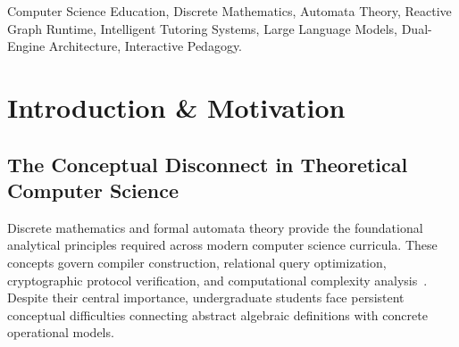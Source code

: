 \documentclass[conference]{IEEEtran}
\begin{document}
\begin{abstract}
Undergraduate computing curricula require students to master abstract discrete mathematics alongside formal language automata. In practice, students struggle because existing instructional tools are fragmented across isolated desktop utilities, while commercial Large Language Models (LLMs) hallucinate arithmetic bounds, invert state transitions, and produce broken \LaTeX{} code. This paper presents \textbf{LogicVerse}, an open-source browser-native visual computing IDE and dual-engine intelligent tutoring system uniting discrete mathematics and formal language automata. LogicVerse incorporates a client-side topological Directed Acyclic Graph (DAG) compilation engine delivering sub-millisecond evaluation ($< 3.5$\,ms for 100-node hypergraphs) alongside \textbf{LogicAI}: a hybrid tutoring architecture uniting a deterministic combinatorial solver (Tier 1) for guaranteed arithmetic precision with an LLM-driven grounded tutor (Tier 2) receiving continuous canvas topology vectors. In a quantitative benchmark of 100 discrete counting problems, LogicVerse achieved 100.0\% precision and 0.0\% hallucination vs. 86.0\% for GPT-4o and 82.5\% for Gemini 1.5. A controlled between-subjects pedagogical user study across $N = 48$ undergraduate students demonstrated higher normalized learning gains ($g = 0.68 \pm 0.12$ vs. $0.34 \pm 0.15$, $p < 0.001$, Cohen's $d = 1.42$), an ``Excellent'' System Usability Scale score (SUS = $86.4 \pm 7.2$), and significant reductions in cognitive workload ($-50.1\%$ mental demand, $-63.3\%$ frustration via NASA-TLX).
\end{abstract}

\begin{IEEEkeywords}
Computer Science Education, Discrete Mathematics, Automata Theory, Reactive Graph Runtime, Intelligent Tutoring Systems, Large Language Models, Dual-Engine Architecture, Interactive Pedagogy.
\end{IEEEkeywords}

\section{Introduction \& Motivation}

\subsection{The Conceptual Disconnect in Theoretical Computer Science}
Discrete mathematics and formal automata theory provide the foundational analytical principles required across modern computer science curricula. These concepts govern compiler construction, relational query optimization, cryptographic protocol verification, and computational complexity analysis~\cite{hopcroft2006, sipser2012}. Despite their central importance, undergraduate students face persistent conceptual difficulties connecting abstract algebraic definitions with concrete operational models.
\end{document}
